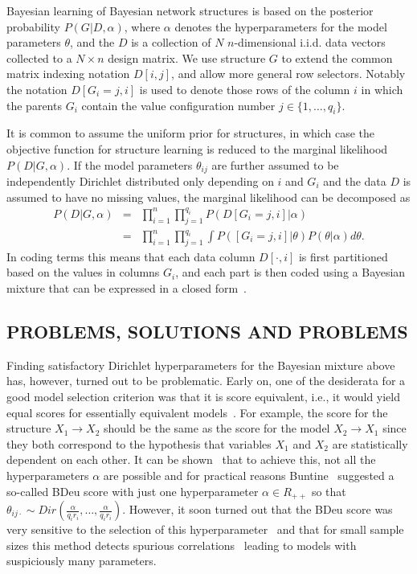 Bayesian learning of Bayesian network structures is based on the
posterior probability $P(G|D,\alpha)$, where $\alpha$ denotes the
hyperparameters for the model parameters $\theta$, and
the $D$ is a collection of $N$ $n$\nobreakdash-dimensional i.i.d. data
vectors collected to a $N\times n$ design matrix.  We use structure
$G$ to extend the common matrix indexing notation $D[i,j]$, and allow
more general row selectors.  Notably the notation $D[G_i=j,i]$ is used
to denote those rows of the column $i$ in which the parents $G_i$
contain the value configuration number $j\in\{1,\ldots,q_i\}$.

It is common to assume the uniform prior for structures, in which case
the objective function for structure learning is reduced to the
marginal likelihood $P(D|G,\alpha)$.  If the model parameters
$\theta_{ij}$ are further assumed to be independently Dirichlet
distributed only depending on $i$ and $G_{i}$ and the data $D$ is
assumed to have no missing values, the marginal likelihood can be
decomposed as
\begin{eqnarray}
\label{eqn:bayesmix}
P(D|G,\alpha) & = & \prod_{i=1}^{n}\prod_{j=1}^{q_i}
P(D[G_i=j,i]|\alpha)\\ & = & \prod_{i=1}^{n}\prod_{j=1}^{q_i}\int
P([G_i=j,i]|\theta)P(\theta|\alpha) d\theta.\nonumber
\end{eqnarray}
In coding terms this means that each data column $D[\cdot,i]$ is first partitioned based on the
values in columns $G_i$, and each part is then coded using a Bayesian mixture that can be expressed
in a closed form~\cite{Bunt91, Heck95}.

\subsection {PROBLEMS, SOLUTIONS AND PROBLEMS}

Finding satisfactory Dirichlet hyperparameters for the Bayesian
mixture above has, however, turned out to be problematic. Early on,
one of the desiderata for a good model selection criterion was that it
is score equivalent, i.e., it would yield equal scores for
essentially equivalent models~\cite{Verm90}.  For example, the score
for the structure $X_1\rightarrow X_2$ should be the same as the score
for the model $X_2 \rightarrow X_1$ since they both correspond to the
hypothesis that variables $X_1$ and $X_2$ are statistically dependent
on each other.  It can be shown~\cite{Heck95} that to achieve this,
not all the hyperparameters $\alpha$ are possible and for practical
reasons Buntine~\cite{Bunt91} suggested a so-called BDeu score with
just one hyperparameter $\alpha\in R_{++}$ so that
$\theta_{ij\cdot}\sim Dir(\frac{\alpha}{q_i
  r_i},\ldots,\frac{\alpha}{q_i r_i})$.  However, it soon turned out
that the BDeu score was very sensitive to the selection of this
hyperparameter~\cite{cosco.uai07} and that for small sample sizes this
method detects spurious correlations~\cite{Steck08} leading to models
with suspiciously many parameters.

